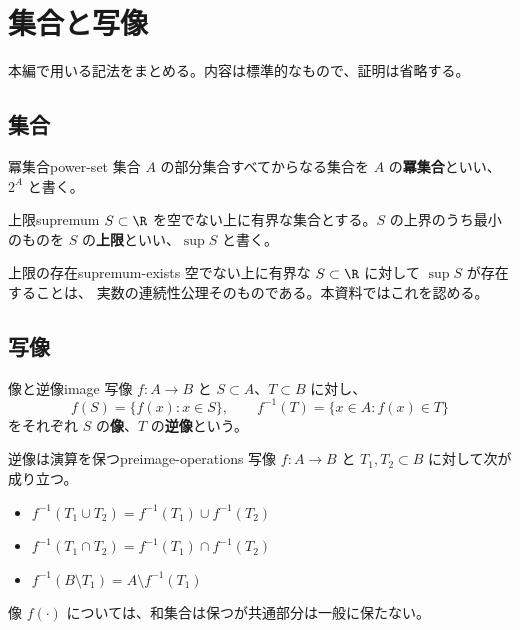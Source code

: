 
\chapter{集合と写像}
\label{ch:preliminaries}

本編で用いる記法をまとめる。内容は標準的なもので、証明は省略する。

\section{集合}
\label{sec:sets}

\begin{definition}{冪集合}{power-set}
集合 $A$ の部分集合すべてからなる集合を $A$ の\textbf{冪集合}といい、$2^A$ と書く。
\end{definition}

\begin{definition}{上限}{supremum}
$S \subset \R$ を空でない上に有界な集合とする。$S$ の上界のうち最小のものを
$S$ の\textbf{上限}といい、$\sup S$ と書く。
\end{definition}

\begin{remark}{上限の存在}{supremum-exists}
空でない上に有界な $S \subset \R$ に対して $\sup S$ が存在することは、
実数の連続性公理そのものである。本資料ではこれを認める。
\end{remark}

\section{写像}
\label{sec:maps}

\begin{definition}{像と逆像}{image}
写像 $f \colon A \to B$ と $S \subset A$、$T \subset B$ に対し、
\[
  f(S) = \{ f(x) : x \in S \},
  \qquad
  f^{-1}(T) = \{ x \in A : f(x) \in T \}
\]
をそれぞれ $S$ の\textbf{像}、$T$ の\textbf{逆像}という。
\end{definition}

\begin{proposition}{逆像は演算を保つ}{preimage-operations}
写像 $f \colon A \to B$ と $T_1, T_2 \subset B$ に対して次が成り立つ。
\begin{itemize}
  \item $f^{-1}(T_1 \cup T_2) = f^{-1}(T_1) \cup f^{-1}(T_2)$
  \item $f^{-1}(T_1 \cap T_2) = f^{-1}(T_1) \cap f^{-1}(T_2)$
  \item $f^{-1}(B \setminus T_1) = A \setminus f^{-1}(T_1)$
\end{itemize}
像 $f(\cdot)$ については、和集合は保つが共通部分は一般に保たない。
\end{proposition}

